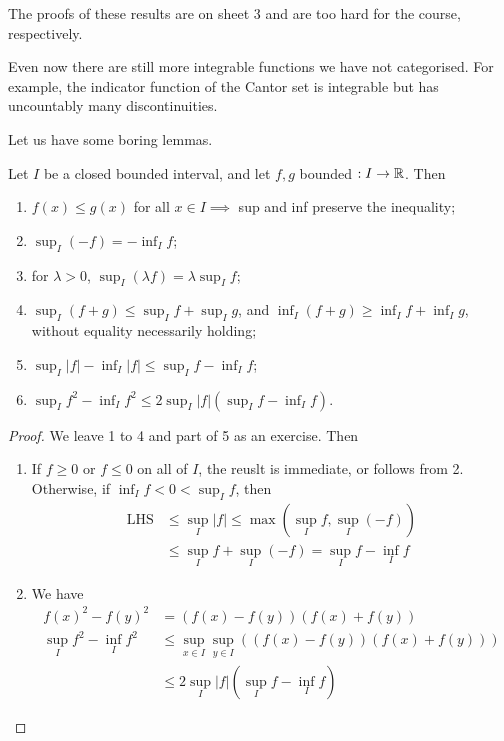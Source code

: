 \documentclass{../../template/note}
\begin{document}
    \begin{remark*}
        The proofs of these results are on sheet 3 and are too hard for the course, respectively.
    \end{remark*}
    
    \begin{remark*}
        Even now there are still more integrable functions we have not categorised. For example, the indicator function of the Cantor set is integrable but has uncountably many discontinuities.
    \end{remark*}
    
    Let us have some boring lemmas.

    \begin{lemma}
        Let \(I\) be a closed bounded interval, and let \(f, g\) bounded \(: I \to \mathbb R\). Then
        \begin{enumerate}
            \item \(f(x) \leq g(x)\) for all \(x \in I \implies\) sup and inf preserve the inequality;
            \item \(\sup_I (-f) = -\inf_I f\);
            \item for \(\lambda > 0\), \(\sup_I(\lambda f) = \lambda \sup_I f\);
            \item \(\sup_I(f+g) \leq \sup_I f + \sup_I g\), and \(\inf_I(f+g) \geq \inf_I f + \inf_I g\), without equality necessarily holding;
            \item \(\sup_I |f| - \inf_I |f| \leq \sup_I f - \inf_I f\);
            \item \(\sup_I f^2 - \inf_I f^2 \leq 2 \sup_I |f|\left(\sup_I f - \inf_I f\right)\).
        \end{enumerate}
    \end{lemma}
    

    \begin{proof}
        We leave 1 to 4 and part of 5 as an exercise. Then
        \begin{enumerate}
            \item[5.] If \(f \geq 0\) or \(f \leq 0\) on all of \(I\), the reuslt is immediate, or follows from 2. Otherwise, if \(\inf_I f < 0 < \sup_I f\), then
            \begin{align*}
                \text{LHS} &\leq \sup_I |f| \leq \max(\sup_I f, \sup_I (-f)) \\
                &\leq \sup_I f + \sup_I(-f) = \sup_I f - \inf_I f
            \end{align*}
            \item [6.] We have
            \begin{align*}
                f(x)^2 - f(y)^2 &= (f(x)-f(y))(f(x)+f(y)) \\
                \sup_I f^2 - \inf_I f^2 &\leq \sup_{x \in I} \sup_{y \in I} \left((f(x)-f(y))(f(x)+f(y))\right) \\
                &\leq 2 \sup_I |f| \left(\sup_I f - \inf_I f\right)
            \end{align*}
        \end{enumerate}
    \end{proof}
\end{document}
